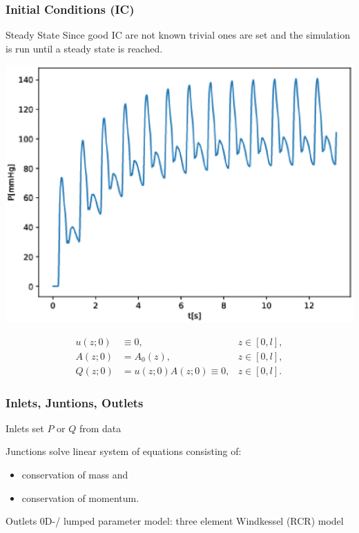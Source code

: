 \documentclass{beamer}
\begin{document}
\begin{frame}
	\frametitle{Initial Conditions (IC)}
	\begin{center}
	\begin{minipage}{0.39\textwidth}
		\begin{block}{Steady State}
			Since good IC are not known trivial ones are set and the simulation is run until a steady state is reached.
		\end{block}

	\end{minipage}
	\begin{minipage}{0.59\textwidth}
	\includegraphics[width=\textwidth]{images/adan56_tibiofibular_trunk_L_P_steady_state.eps}
	\end{minipage}
	\hfill
	\begin{align}
		u(z;0) &\equiv 0, &z \in [0,l],\\
		A(z;0) &= A_0(z), &z \in [0,l], \\
		Q(z;0) &= u(z;0)A(z;0) \equiv 0, &z \in [0,l].
	\end{align}
	\end{center}
\end{frame}
\begin{frame}
	\frametitle{Inlets, Juntions, Outlets}
	\begin{block}{Inlets}
		set $P$ or $Q$ from data 	
	\end{block}
	\begin{block}{Junctions}
		solve linear system of equations consisting of:
		\begin{itemize}
			\item conservation of mass and
			\item conservation of momentum.
		\end{itemize}
	\end{block}
	\begin{block}{Outlets}
		0D-/ lumped parameter model: three element Windkessel (RCR) model 
	\end{block}
\end{frame}
\end{document}
